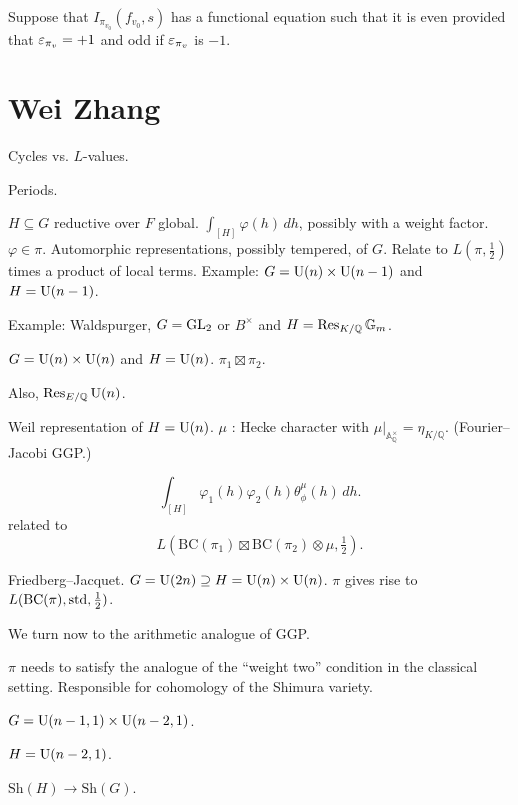 \documentclass[reqno]{amsart} 
\begin{document}
Suppose that $I_{\pi_{v_0}}(f_{v_0}, s)$ has a functional equation such that it is even provided that $\varepsilon_{\pi_v} = +1$ and odd if $\varepsilon_{\pi_v}$ is $-1$.









\section{Wei Zhang}

Cycles vs. $L$-values.

Periods.

$H \subseteq G$ reductive over $F$ global.  $\int_{[H]} \varphi(h) \, d h$, possibly with a weight factor.  $\varphi \in \pi$.  Automorphic representations, possibly tempered, of $G$.  Relate to $L(\pi, \tfrac{1}{2})$ times a product of local terms.  Example: $G = \operatorname{U}(n) \times \operatorname{U}(n-1)$ and $H = \operatorname{U}(n-1)$.

Example: Waldspurger, $G = \operatorname{GL}_2$ or $B^\times $ and $H = \operatorname{Res}_{K / \mathbb{Q}}\mathbb{G}_m$.

$G = \operatorname{U}(n) \times \operatorname{U}(n)$ and $H = \operatorname{U}(n)$.  $\pi_1 \boxtimes \pi_2$.

Also, $\operatorname{Res}_{E / \mathbb{Q}} \operatorname{U}(n)$.

Weil representation of $H =\operatorname{U}(n)$.  $\mu$ : Hecke character with $\mu |_{\mathbb{A}_{\mathbb{Q}}^\times } = \eta_{K/\mathbb{Q}}$.  (Fourier--Jacobi GGP.)

\begin{equation*}
\int_{[H]} \varphi_1(h) \varphi_2(h) \theta_\phi^\mu(h) \, d h.
\end{equation*}
related to
\begin{equation*}
L\left(\mathrm{BC}(\pi_1) \boxtimes \mathrm{BC}(\pi_2) \otimes \mu, \tfrac{1}{2}\right).
\end{equation*}

Friedberg--Jacquet.  $G = \operatorname{U}(2 n) \supseteq H = \operatorname{U}(n) \times \operatorname{U}(n)$.  $\pi$ gives rise to $L(\mathrm{BC}(\pi), \operatorname{std}, \tfrac{1}{2})$.

We turn now to the arithmetic analogue of GGP.

$\pi$ needs to satisfy the analogue of the ``weight two'' condition in the classical setting.  Responsible for cohomology of the Shimura variety.

$G = \operatorname{U}(n - 1, 1) \times \operatorname{U}(n - 2, 1)$.

$H = \operatorname{U}(n-2,1)$.

$\mathrm{Sh}(H) \rightarrow \mathrm{Sh}(G)$.
\end{document}

